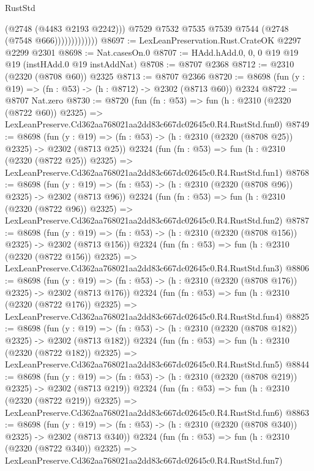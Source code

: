 \begin{lexlean}{RustStd}
\begin{coremodule}
                            (@2748 (@4483 @2193 @2242)))
                          @7529
                          @7532
                          @7535
                          @7539
                          @7544
                          (@2748 (@7548 @666)))))))))))))
@8697 := LexLeanPreservation.Rust.CrateOK @2297 @2299 @2301
@8698 := Nat.casesOn.{0}
@8707 := HAdd.hAdd.{0, 0, 0} @19 @19 @19 (instHAdd.{0} @19 instAddNat)
@8708 := @8707 @2368
@8712 := @2310 (@2320 (@8708 @60)) @2325
@8713 := @8707 @2366
@8720 := @8698 (fun (y : @19) => (fn : @53) -> (h : @8712) -> @2302 (@8713 @60)) @2324
@8722 := @8707 Nat.zero
@8730 := @8720
    (fun (fn : @53) =>
    fun (h : @2310 (@2320 (@8722 @60)) @2325) =>
    LexLeanPreserve.Cd362aa768021aa2dd83c667dc02645c0.R4.RustStd.fun0)
@8749 := @8698
    (fun (y : @19) => (fn : @53) -> (h : @2310 (@2320 (@8708 @25)) @2325) -> @2302 (@8713 @25))
    @2324
    (fun (fn : @53) =>
    fun (h : @2310 (@2320 (@8722 @25)) @2325) =>
    LexLeanPreserve.Cd362aa768021aa2dd83c667dc02645c0.R4.RustStd.fun1)
@8768 := @8698
    (fun (y : @19) => (fn : @53) -> (h : @2310 (@2320 (@8708 @96)) @2325) -> @2302 (@8713 @96))
    @2324
    (fun (fn : @53) =>
    fun (h : @2310 (@2320 (@8722 @96)) @2325) =>
    LexLeanPreserve.Cd362aa768021aa2dd83c667dc02645c0.R4.RustStd.fun2)
@8787 := @8698
    (fun (y : @19) => (fn : @53) -> (h : @2310 (@2320 (@8708 @156)) @2325) -> @2302 (@8713 @156))
    @2324
    (fun (fn : @53) =>
    fun (h : @2310 (@2320 (@8722 @156)) @2325) =>
    LexLeanPreserve.Cd362aa768021aa2dd83c667dc02645c0.R4.RustStd.fun3)
@8806 := @8698
    (fun (y : @19) => (fn : @53) -> (h : @2310 (@2320 (@8708 @176)) @2325) -> @2302 (@8713 @176))
    @2324
    (fun (fn : @53) =>
    fun (h : @2310 (@2320 (@8722 @176)) @2325) =>
    LexLeanPreserve.Cd362aa768021aa2dd83c667dc02645c0.R4.RustStd.fun4)
@8825 := @8698
    (fun (y : @19) => (fn : @53) -> (h : @2310 (@2320 (@8708 @182)) @2325) -> @2302 (@8713 @182))
    @2324
    (fun (fn : @53) =>
    fun (h : @2310 (@2320 (@8722 @182)) @2325) =>
    LexLeanPreserve.Cd362aa768021aa2dd83c667dc02645c0.R4.RustStd.fun5)
@8844 := @8698
    (fun (y : @19) => (fn : @53) -> (h : @2310 (@2320 (@8708 @219)) @2325) -> @2302 (@8713 @219))
    @2324
    (fun (fn : @53) =>
    fun (h : @2310 (@2320 (@8722 @219)) @2325) =>
    LexLeanPreserve.Cd362aa768021aa2dd83c667dc02645c0.R4.RustStd.fun6)
@8863 := @8698
    (fun (y : @19) => (fn : @53) -> (h : @2310 (@2320 (@8708 @340)) @2325) -> @2302 (@8713 @340))
    @2324
    (fun (fn : @53) =>
    fun (h : @2310 (@2320 (@8722 @340)) @2325) =>
    LexLeanPreserve.Cd362aa768021aa2dd83c667dc02645c0.R4.RustStd.fun7)

\end{coremodule}
\end{lexlean}
